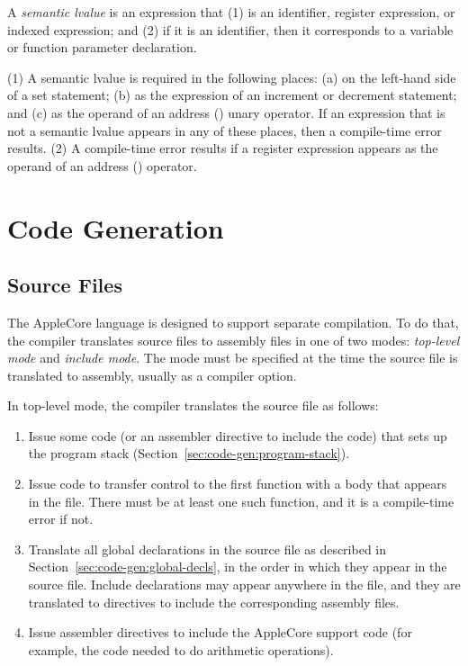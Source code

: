 \documentclass[10pt]{article}
\begin{document}
  A \emph{semantic lvalue} is
an expression that (1) is an identifier, register expression, or
indexed expression; and (2) if it is an identifier, then it
corresponds to a variable or function parameter declaration.

  (1) A semantic lvalue is
required in the following places: (a) on the left-hand side of a set
statement; (b) as the expression of an increment or decrement
statement; and (c) as the operand of an address () unary
operator.  If an expression that is not a semantic lvalue appears in
any of these places, then a compile-time error results.  (2) A
compile-time error results if a register expression appears as the
operand of an address () operator.


\section{Code Generation}
\label{sec:code-gen}

\subsection{Source Files}
\label{sec:code-gen:source-files}

The AppleCore language is designed to support separate compilation.
To do that, the compiler translates source files to assembly files in
one of two modes: \emph{top-level mode} and \emph{include mode}.  The
mode must be specified at the time the source file is translated to
assembly, usually as a compiler option.

  In top-level mode, the compiler translates
the source file as follows:
%
\begin{enumerate}
%
\item Issue some code (or an assembler directive to include the code)
  that sets up the program stack
  (Section~\ref{sec:code-gen:program-stack}).
%
\item Issue code to transfer control to the first function with a body
  that appears in the file.  There must be at least one such function,
  and it is a compile-time error if not.
%
\item Translate all global declarations in the source file as
  described in Section~\ref{sec:code-gen:global-decls}, in the
  order in which they appear in the source file.  Include declarations
  may appear anywhere in the file, and they are translated to
  directives to include the corresponding assembly files.
%
\item Issue assembler directives to include the AppleCore support code
  (for example, the code needed to do arithmetic operations).
%
\end{enumerate}
%
\end{document}
